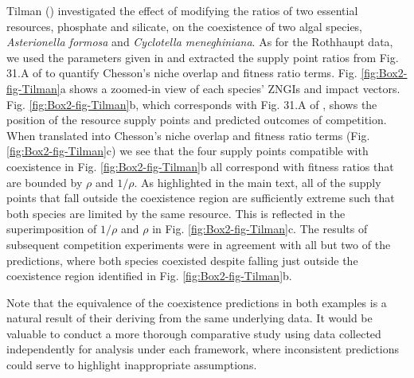 \begin{infobox}
Tilman (\citeyear{Tilman1977, tilman1982}) investigated the effect of modifying the ratios of two essential resources, phosphate and silicate, on the coexistence of two algal species, \textit{Asterionella formosa} and \textit{Cyclotella meneghiniana}. As for the Rothhaupt data, we used the parameters given in \cite{Tilman1977} and extracted the supply point ratios from Fig. 31.A of \citet{tilman1982} to quantify Chesson's niche overlap and fitness ratio terms. Fig. \ref{fig:Box2-fig-Tilman}a shows a zoomed-in view of each species' ZNGIs and impact vectors. Fig. \ref{fig:Box2-fig-Tilman}b, which corresponds with Fig. 31.A of \citet{tilman1982}, shows the position of the resource supply points and predicted outcomes of competition. When translated into Chesson's niche overlap and fitness ratio terms (Fig. \ref{fig:Box2-fig-Tilman}c) we see that the four supply points compatible with coexistence in Fig. \ref{fig:Box2-fig-Tilman}b all correspond with fitness ratios that are bounded by $\rho$ and $1/\rho$. As highlighted in the main text, all of the supply points that fall outside the coexistence region are sufficiently extreme such that both species are limited by the same resource. This is reflected in the superimposition of $1/\rho$ and $\rho$ in Fig. \ref{fig:Box2-fig-Tilman}c. The results of subsequent competition experiments were in agreement with all but two of the predictions, where both species coexisted despite falling just outside the coexistence region identified in Fig. \ref{fig:Box2-fig-Tilman}b.
\par


Note that the equivalence of the coexistence predictions in both examples is a natural result of their deriving from the same underlying data. It would be valuable to conduct a more thorough comparative study using data collected independently for analysis under each framework, where inconsistent predictions could serve to highlight inappropriate assumptions.
\end{infobox}
